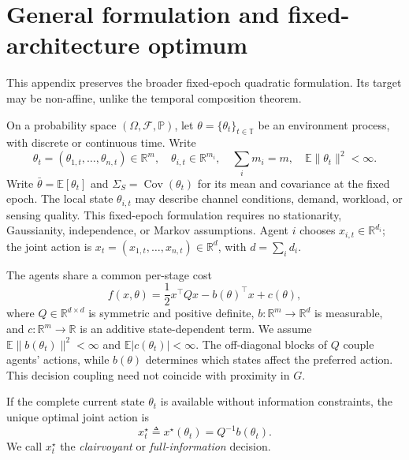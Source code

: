 \section{General formulation and fixed-architecture optimum}
\label{app:technical-projection}
\label{subsec:projection}

This appendix preserves the broader fixed-epoch quadratic formulation.
Its target may be non-affine, unlike the temporal composition theorem.

On a probability space $(\Omega,\mathcal F,\mathbb P)$, let
$\theta=\{\theta_t\}_{t\in\mathbb T}$ be an environment process,
with discrete or continuous time. Write
\begin{equation}
\theta_t=(\theta_{1,t},\ldots,\theta_{n,t})\in\mathbb R^m,
\quad \theta_{i,t}\in\mathbb R^{m_i},\quad \sum_i m_i=m,
\quad \mathbb E\|\theta_t\|^2<\infty.
\label{eq:state_partition}
\end{equation}
Write $\bar\theta=\mathbb E[\theta_t]$ and
$\Sigma_S=\operatorname{Cov}(\theta_t)$ for its mean and covariance at the fixed epoch.
The local state $\theta_{i,t}$ may describe channel conditions, demand,
workload, or sensing quality. This fixed-epoch formulation requires no
stationarity, Gaussianity, independence, or Markov assumptions. Agent $i$ chooses
$x_{i,t}\in\mathbb R^{d_i}$; the joint action is
$x_t=(x_{1,t},\ldots,x_{n,t})\in\mathbb R^d$, with $d=\sum_i d_i$.

The agents share a common per-stage cost
\begin{equation}
    f(x,\theta)
    =
    \frac{1}{2}x^\top Qx
    -
    b(\theta)^\top x
    +
    c(\theta),
    \label{eq:quadratic_cost}
\end{equation}
where $Q\in\mathbb{R}^{d\times d}$ is symmetric and positive definite,
$b:\mathbb{R}^{m}\rightarrow\mathbb{R}^{d}$ is measurable, and
$c:\mathbb{R}^{m}\rightarrow\mathbb{R}$ is an additive state-dependent term.
We assume $\mathbb E\|b(\theta_t)\|^2<\infty$ and
$\mathbb E|c(\theta_t)|<\infty$. The off-diagonal blocks of $Q$ couple agents'
actions, while $b(\theta)$ determines which states affect the preferred action.
This decision coupling need not coincide with proximity in $G$.

If the complete current state $\theta_t$ is available without information
constraints, the unique optimal joint action is
\begin{equation}
    x_t^\star
    \triangleq
    x^\star(\theta_t)
    =
    Q^{-1}b(\theta_t).
    \label{eq:clairvoyant}
\end{equation}
We call $x_t^\star$ the \emph{clairvoyant} or \emph{full-information}
decision.

